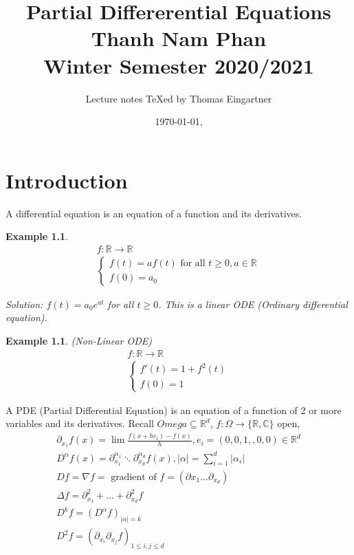 \documentclass[ngerman, BCOR=5mm]{report}
\title{Partial Differerential Equations \\ Thanh Nam Phan \\ Winter Semester 2020/2021}
\author{Lecture notes \TeX ed by Thomas Eingartner}
\date{\today, \currenttime}
\theoremstyle{tommy}
\newtheorem{eg}[defn]{Example}
\begin{document}
\maketitle
\tableofcontents
\newpage



\chapter{Introduction}

A differential equation is an equation of a function and its derivatives. 

\begin{eg}
  \begin{align*}
    f: \mathbb{R} \to \mathbb{R} \\
    \begin{cases}
      f(t) = a f(t) \text{ for all } t \ge 0, a \in \mathbb{R} \\
      f(0) = a_0
    \end{cases}
  \end{align*}

  Solution: \(f(t) = a_0 e^{at}\) for all \(t \ge 0\). This is a linear ODE (Ordinary differential equation).
\end{eg}

\begin{eg} (Non-Linear ODE)
  \begin{align*}
    f: \mathbb{R} \to \mathbb{R} \\
    \begin{cases}
      f'(t) = 1 + f^2(t) \\
      f(0) = 1
    \end{cases}
  \end{align*}
\end{eg}

A PDE (Partial Differential Equation) is an equation of a function of 2 or more variables and its derivatives. Recall \(Omega \subseteq \mathbb{R}^d\), \(f: \Omega \to \{\mathbb{R}, \mathbb{C}\}\) open, 
\begin{align*}
  \partial_{x_1} f(x) = \lim \frac{f(x + he_i) - f(x)}{h}, e_i = (0,0, 1,, 0, 0) \in \mathbb{R}^d \\
  D^\alpha f(x) = \partial_{x_1}^{\alpha_1} \ddots \partial_{x_d}^{\alpha_d} f(x), |\alpha| = \sum_{i=1}^d |\alpha_i| \\
  Df = \nabla f = \text{ gradient of } f = (\partial{x_1} \dots \partial_{x_d}) \\
  \Delta f = \partial_{x_1}^2 + \dots + \partial^2_{x_d} f \\
  D^kf = (D^\alpha f)_{|\alpha| = k} \\
  D^2 f = (\partial_{x_i} \partial_{x_j} f)_{1 \le i, j \le d}
\end{align*}
\end{document}
